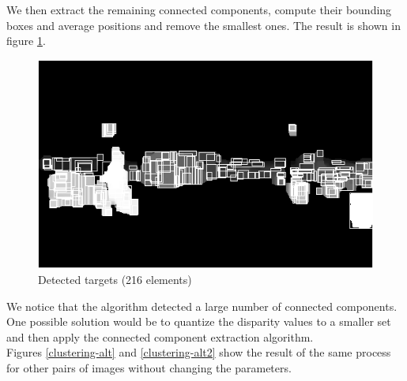\documentclass[a4paper,11pt]{article}
\begin{document}
We then extract the remaining connected components, compute their bounding boxes and average positions and remove the smallest ones. The result is shown in figure \ref{clustering}.

\begin{figure}[H]
\centering
\includegraphics[scale=0.5]{pic/detected-targets.png}
\caption{Detected targets (216 elements)}
\label{clustering}
\end{figure}

We notice that the algorithm detected a large number of connected components. One possible solution would be to quantize the disparity values to a smaller set and then apply the connected component extraction algorithm.\\
Figures \ref{clustering-alt} and \ref{clustering-alt2} show the result of the same process for other pairs of images without changing the parameters.
\end{document}
